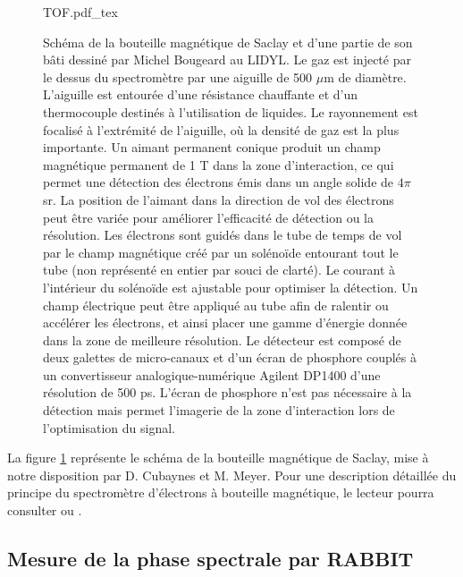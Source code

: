 \begin{figure}
\centering
\def\svgwidth{\columnwidth}
{TOF.pdf_tex}
\caption{Schéma de la bouteille magnétique de Saclay et d'une partie de son bâti dessiné par Michel Bougeard au LIDYL. Le gaz est injecté par le dessus du spectromètre par une aiguille de 500 $\mu$m de diamètre. L'aiguille est entourée d'une résistance chauffante et d'un thermocouple destinés à l'utilisation de liquides. Le rayonnement est focalisé à l'extrémité de l'aiguille, où la densité de gaz est la plus importante. Un aimant permanent conique produit un champ magnétique permanent de 1 T dans la zone d'interaction, ce qui permet une détection des électrons émis dans un angle solide de $4 \pi$ sr. La position de l'aimant dans la direction de vol des électrons peut être variée pour améliorer l'efficacité de détection ou la résolution. Les électrons sont guidés dans le tube de temps de vol par le champ magnétique créé par un solénoïde entourant tout le tube (non représenté en entier par souci de clarté). Le courant à l'intérieur du solénoïde est ajustable pour optimiser la détection. Un champ électrique peut être appliqué au tube afin de ralentir ou accélérer les électrons, et ainsi placer une gamme d'énergie donnée dans la zone de meilleure résolution. Le détecteur est composé de deux galettes de micro-canaux et d'un écran de phosphore couplés à un convertisseur analogique-numérique Agilent DP1400 d'une résolution de 500 ps. L'écran de phosphore n'est pas nécessaire à la détection mais permet l'imagerie de la zone d'interaction lors de l'optimisation du signal.}
\label{fig:TOF}
\end{figure}

La figure \ref{fig:TOF} représente le schéma de la bouteille magnétique de Saclay, mise à notre disposition par D. Cubaynes et M. Meyer. Pour une description détaillée du principe du spectromètre d'électrons à bouteille magnétique, le lecteur pourra consulter  ou .

\subsection{Mesure de la phase spectrale par RABBIT}
